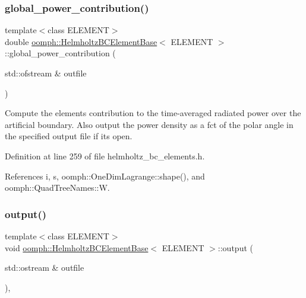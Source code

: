 \subsubsection{\texorpdfstring{global\+\_\+power\+\_\+contribution()}{global\_power\_contribution()}\hspace{0.1cm}{\footnotesize\ttfamily [2/2]}}
{\footnotesize\ttfamily template$<$class E\+L\+E\+M\+E\+NT$>$ \\
double \hyperlink{classoomph_1_1HelmholtzBCElementBase}{oomph\+::\+Helmholtz\+B\+C\+Element\+Base}$<$ E\+L\+E\+M\+E\+NT $>$\+::global\+\_\+power\+\_\+contribution (\begin{DoxyParamCaption}\item[{std\+::ofstream \&}]{outfile }\end{DoxyParamCaption})\hspace{0.3cm}{\ttfamily [inline]}}



Compute the element\textquotesingle{}s contribution to the time-\/averaged radiated power over the artificial boundary. Also output the power density as a fct of the polar angle in the specified output file if it\textquotesingle{}s open. 



Definition at line 259 of file helmholtz\+\_\+bc\+\_\+elements.\+h.



References i, s, oomph\+::\+One\+Dim\+Lagrange\+::shape(), and oomph\+::\+Quad\+Tree\+Names\+::W.

\mbox{\label{classoomph_1_1HelmholtzBCElementBase_a7337e98fa91e804f02d2d1642b01977b}} 
\subsubsection{\texorpdfstring{output()}{output()}\hspace{0.1cm}{\footnotesize\ttfamily [1/4]}}
{\footnotesize\ttfamily template$<$class E\+L\+E\+M\+E\+NT$>$ \\
void \hyperlink{classoomph_1_1HelmholtzBCElementBase}{oomph\+::\+Helmholtz\+B\+C\+Element\+Base}$<$ E\+L\+E\+M\+E\+NT $>$\+::output (\begin{DoxyParamCaption}\item[{std\+::ostream \&}]{outfile }\end{DoxyParamCaption})\hspace{0.3cm}{\ttfamily [inline]}, {\ttfamily [virtual]}}

